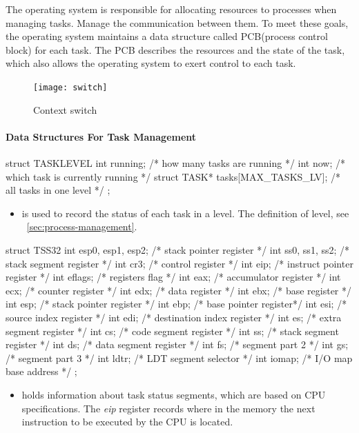\documentclass{swfcthesis}
\begin{document}
The operating system is responsible for allocating resources to processes when managing
tasks. Manage the communication between them. To meet these goals, the operating system
maintains a data structure called PCB(process control block) for each task. The PCB
describes the resources and the state of the task, which also allows the operating system to
exert control to each task.



\begin{figure}
  \centering
  \begin{center}
    \texttt{[image: switch]}
  \end{center}
  \caption{Context switch}
  \label{fig:ctxt-switch}
\end{figure}

\paragraph{Data Structures For Task Management}

\begin{codeblock}[1]
\begin{ccode}
struct TASKLEVEL
{ 
  int running; /* how many tasks are running */
  int now;     /* which task is currently running */
  struct TASK* tasks[MAX_TASKS_LV]; /* all tasks in one level */
};
\end{ccode}
\end{codeblock}
\begin{itemize}
\item is used to record the status of each task in a level. The definition of level, see
  ~\ref{sec:process-management}.
  
  
\end{itemize}

\begin{codeblock}[1]
\begin{ccode}
struct TSS32
{ 
  int esp0, esp1, esp2; /* stack pointer register */
  int ss0, ss1, ss2;    /* stack segment register */
  int cr3;    /* control register */
  int eip;    /* instruct pointer register */
  int eflags; /* registers flag */
  int eax;    /* accumulator register */
  int ecx;    /* counter register */
  int edx;    /* data register */
  int ebx;    /* base register */
  int esp;    /* stack pointer register */
  int ebp;    /* base pointer register*/
  int esi;    /* source index register */
  int edi;    /* destination index register */
  int es;     /* extra segment register */
  int cs;     /* code segment register */
  int ss;     /* stack segment register */
  int ds;     /* data segment register */
  int fs;     /* segment part 2 */
  int gs;     /* segment part 3 */
  int ldtr;   /* LDT segment selector */
  int iomap;  /* I/O map base address */
};
\end{ccode}
\end{codeblock}
\begin{itemize}
\item holds information about task status segments, which are based on CPU
  specifications\cite[Sec.6.2.1]{intel_3a}. The \emph{eip} register records where in the
  memory the next instruction to be executed by the CPU is located.
\end{itemize}
\end{document}
